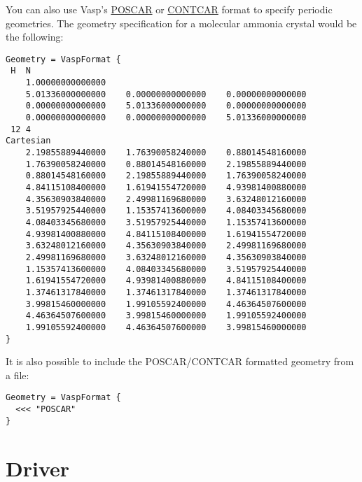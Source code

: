 You can also use Vasp's \href{https://www.vasp.at/wiki/index.php/POSCAR}{POSCAR} or
\href{https://www.vasp.at/wiki/index.php/CONTCAR}{CONTCAR} format to specify periodic geometries.
The geometry specification for a molecular ammonia crystal would be the following:
\begin{verbatim}
Geometry = VaspFormat {
 H  N
    1.00000000000000
    5.01336000000000    0.00000000000000    0.00000000000000
    0.00000000000000    5.01336000000000    0.00000000000000
    0.00000000000000    0.00000000000000    5.01336000000000
 12 4
Cartesian
    2.19855889440000    1.76390058240000    0.88014548160000
    1.76390058240000    0.88014548160000    2.19855889440000
    0.88014548160000    2.19855889440000    1.76390058240000
    4.84115108400000    1.61941554720000    4.93981400880000
    4.35630903840000    2.49981169680000    3.63248012160000
    3.51957925440000    1.15357413600000    4.08403345680000
    4.08403345680000    3.51957925440000    1.15357413600000
    4.93981400880000    4.84115108400000    1.61941554720000
    3.63248012160000    4.35630903840000    2.49981169680000
    2.49981169680000    3.63248012160000    4.35630903840000
    1.15357413600000    4.08403345680000    3.51957925440000
    1.61941554720000    4.93981400880000    4.84115108400000
    1.37461317840000    1.37461317840000    1.37461317840000
    3.99815460000000    1.99105592400000    4.46364507600000
    4.46364507600000    3.99815460000000    1.99105592400000
    1.99105592400000    4.46364507600000    3.99815460000000
}
\end{verbatim}
It is also possible to include the POSCAR/CONTCAR formatted geometry from a file:
\begin{verbatim}
Geometry = VaspFormat {
  <<< "POSCAR"
}
\end{verbatim}


\section{Driver}
\label{sec:dftbp.Driver}

